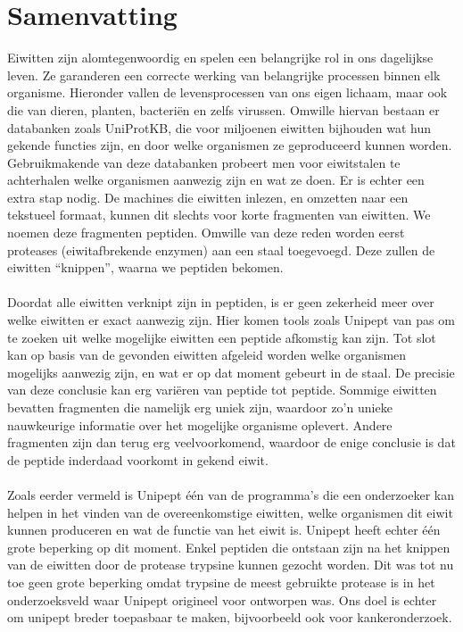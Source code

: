 \chapter*{Samenvatting}
Eiwitten zijn alomtegenwoordig en spelen een belangrijke rol in ons dagelijkse leven.
Ze garanderen een correcte werking van belangrijke processen binnen elk organisme.
Hieronder vallen de levensprocessen van ons eigen lichaam, maar ook die van dieren, planten, bacteriën en zelfs virussen.
Omwille hiervan bestaan er databanken zoals UniProtKB, die voor miljoenen eiwitten bijhouden wat hun gekende functies zijn, en door welke organismen ze geproduceerd kunnen worden.
Gebruikmakende van deze databanken probeert men voor eiwitstalen te achterhalen welke organismen aanwezig zijn en wat ze doen.
Er is echter een extra stap nodig.
De machines die eiwitten inlezen, en omzetten naar een tekstueel formaat, kunnen dit slechts voor korte fragmenten van eiwitten.
We noemen deze fragmenten peptiden.
Omwille van deze reden worden eerst proteases (eiwitafbrekende enzymen) aan een staal toegevoegd.
Deze zullen de eiwitten ``knippen'', waarna we peptiden bekomen.
\\ \\
Doordat alle eiwitten verknipt zijn in peptiden, is er geen zekerheid meer over welke eiwitten er exact aanwezig zijn.
Hier komen tools zoals Unipept van pas om te zoeken uit welke mogelijke eiwitten een peptide afkomstig kan zijn.
Tot slot kan op basis van de gevonden eiwitten afgeleid worden welke organismen mogelijks aanwezig zijn, en wat er op dat moment gebeurt in de staal.
De precisie van deze conclusie kan erg variëren van peptide tot peptide.
Sommige eiwitten bevatten fragmenten die namelijk erg uniek zijn, waardoor zo'n unieke nauwkeurige informatie over het mogelijke organisme oplevert.
Andere fragmenten zijn dan terug erg veelvoorkomend, waardoor de enige conclusie is dat de peptide inderdaad voorkomt in gekend eiwit.
\\ \\
Zoals eerder vermeld is Unipept één van de programma's die een onderzoeker kan helpen in het vinden van de overeenkomstige eiwitten, welke organismen dit eiwit kunnen produceren en wat de functie van het eiwit is.
Unipept heeft echter één grote beperking op dit moment.
Enkel peptiden die ontstaan zijn na het knippen van de eiwitten door de protease trypsine kunnen gezocht worden.
Dit was tot nu toe geen grote beperking omdat trypsine de meest gebruikte protease is in het onderzoeksveld waar Unipept origineel voor ontworpen was.
Ons doel is echter om unipept breder toepasbaar te maken, bijvoorbeeld ook voor kankeronderzoek.
